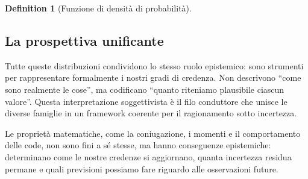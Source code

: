 \documentclass[
  letterpaper,
  DIV=11,
  numbers=noendperiod,
  oneside]{scrreprt}
\theoremstyle{definition}
\theoremstyle{plain}
\theoremstyle{definition}
\newtheorem{definition}{Definition}[chapter]
\theoremstyle{remark}
\begin{document}
\begin{definition}[Funzione di densità di
probabilità]
\subsection*{La prospettiva unificante}\label{la-prospettiva-unificante}

Tutte queste distribuzioni condividono lo stesso ruolo epistemico: sono
strumenti per rappresentare formalmente i nostri gradi di credenza. Non
descrivono ``come sono realmente le cose'', ma codificano ``quanto
riteniamo plausibile ciascun valore''. Questa interpretazione
soggettivista è il filo conduttore che unisce le diverse famiglie in un
framework coerente per il ragionamento sotto incertezza.

Le proprietà matematiche, come la coniugazione, i momenti e il
comportamento delle code, non sono fini a sé stesse, ma hanno
conseguenze epistemiche: determinano come le nostre credenze si
aggiornano, quanta incertezza residua permane e quali previsioni
possiamo fare riguardo alle osservazioni future.

\begin{tcolorbox}[enhanced jigsaw, arc=.35mm, breakable, colbacktitle=quarto-callout-caution-color!10!white, opacityback=0, toprule=.15mm, rightrule=.15mm, colback=white, opacitybacktitle=0.6, leftrule=.75mm, coltitle=black, bottomtitle=1mm, left=2mm, toptitle=1mm, title=\textcolor{quarto-callout-caution-color}{\faFire}\hspace{0.5em}{Informazioni sull'ambiente di sviluppo}, titlerule=0mm, bottomrule=.15mm, colframe=quarto-callout-caution-color-frame]


\end{tcolorbox}
\end{definition}
\end{document}
